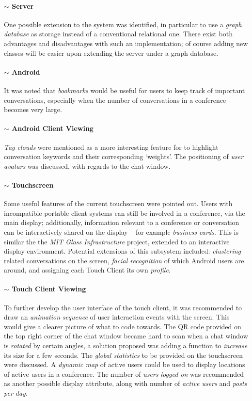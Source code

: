 \documentclass[12p, a4paper, onecolumn]{report}
\begin{document}
\paragraph{$\sim$ Server}
One possible extension to the system was identified, in particular to use a \emph{graph database} as storage instead of a conventional relational one. There exist both advantages and disadvantages with such an implementation; of course adding new classes will be easier upon extending the server under a graph database.

\paragraph{$\sim$ Android}
It was noted that \emph{bookmarks} would be useful for users to keep track of important conversations, especially when the number of conversations in a conference becomes very large.

\paragraph{$\sim$ Android Client Viewing}
\emph{Tag clouds} were mentioned as a more interesting feature for to highlight conversation keywords and their corresponding ‘weights’. The positioning of \emph{user avatars} was discussed, with regards to the chat window.

\paragraph{$\sim$ Touchscreen}
Some useful features of the current touchscreen were pointed out. Users with incompatible portable client systems can still be involved in a conference, via the main display; additionally, information relevant to a conference or conversation can be interactively shared on the display -- for example \emph{business cards}. This is similar the the \emph{MIT Glass Infrastructure} project, extended to an interactive display environment. Potential extensions of this subsystem included: \emph{clustering} related conversations on the screen, \emph{facial recognition} of which Android users are around, and assigning each Touch Client its own \emph{profile}.

\paragraph{$\sim$ Touch Client Viewing}
To further develop the user interface of the touch client, it was recommended to draw an \emph{animation sequence} of user interaction events with the screen. This would give a clearer picture of what to code towards. The QR code provided on the top right corner of the chat window became hard to scan when a chat window is \emph{rotated} by certain angles, a solution proposed was adding a function to \emph{increase} its size for a few seconds. The \emph{global statistics} to be provided on the touchscreen were discussed. A \emph{dynamic map} of active users could be used to display locations of active users in a conference. The number of \emph{users logged on} was recommended as another possible display attribute, along with number of \emph{active users} and \emph{posts per day}.
\end{document}
